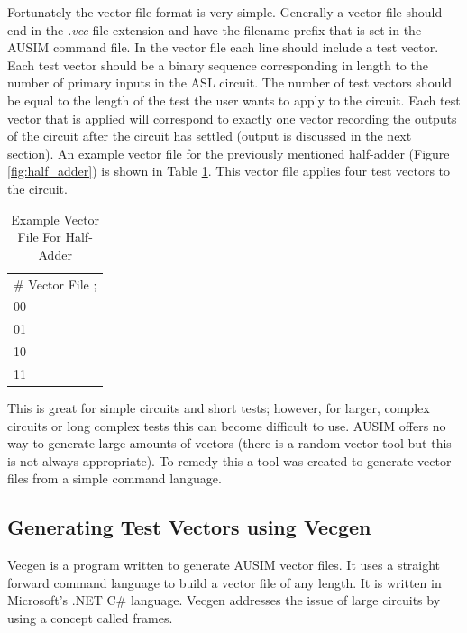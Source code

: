 \documentclass[12pt]{report}
\begin{document}
Fortunately the vector file format is very simple.  Generally a vector file should end in the \textit{.vec} file extension and have the filename prefix that is set in the AUSIM command file\cite{ausim}.  In the vector file each line should include a test vector.  Each test vector should be a binary sequence corresponding in length to the number of primary inputs in the ASL circuit.  The number of test vectors should be equal to the length of the test the user wants to apply to the circuit.  Each test vector that is applied will correspond to exactly one vector recording the outputs of the circuit after the circuit has settled (output is discussed in the next section).  An example vector file for the previously mentioned half-adder (Figure \ref{fig:half_adder}) is shown in Table \ref{tbl:half_adder_vector}.  This vector file applies four test vectors to the circuit.
\begin{table}
	\begin{center}
		\begin{tabular}{l}
			\# Vector File ; \\
			00 \\
			01 \\
			10 \\
			11 \\
		\end{tabular}
	\end{center}
	\caption{Example Vector File For Half-Adder}
	\label{tbl:half_adder_vector}
\end{table}

This is great for simple circuits and short tests; however, for larger, complex circuits or long complex tests this can become difficult to use.  AUSIM offers no way to generate large amounts of vectors (there is a random vector tool\cite{ausim} but this is not always appropriate).  To remedy this a tool was created to generate vector files from a simple command language.

\subsection{Generating Test Vectors using Vecgen}
Vecgen is a program written to generate AUSIM vector files.  It uses a straight forward command language to build a vector file of any length.  It is written in Microsoft's .NET C\#\cite{csharp} language. Vecgen addresses the issue of large circuits by using a concept called frames.  
\end{document}
